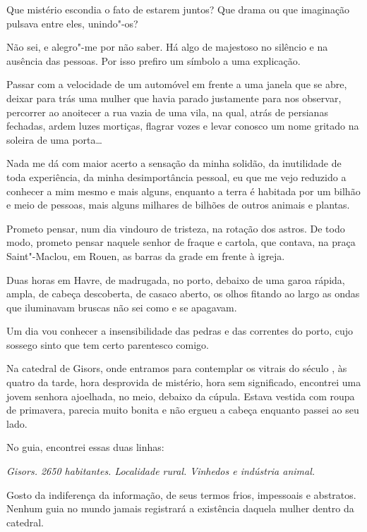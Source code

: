 Que mistério escondia o fato de estarem juntos? Que drama ou que
imaginação pulsava entre eles, unindo"-os?

Não sei, e alegro"-me por não saber. Há algo de majestoso no silêncio e
na ausência das pessoas. Por isso prefiro um símbolo a uma explicação.

\asterisc

Passar com a velocidade de um automóvel em frente a uma janela que se
abre, deixar para trás uma mulher que havia parado justamente para nos
observar, percorrer ao anoitecer a rua vazia de uma vila, na qual, atrás
de persianas fechadas, ardem luzes mortiças, flagrar vozes e levar
conosco um nome gritado na soleira de uma porta\ldots{}

Nada me dá com maior acerto a sensação da minha solidão, da inutilidade
de toda experiência, da minha desimportância pessoal, eu que me vejo
reduzido a conhecer a mim mesmo e mais alguns, enquanto a terra é
habitada por um bilhão e meio de pessoas, mais alguns milhares de
bilhões de outros animais e plantas.

Prometo pensar, num dia vindouro de tristeza, na rotação dos astros. De
todo modo, prometo pensar naquele senhor de fraque e cartola, que
contava, na praça Saint"-Maclou, em Rouen, as barras da grade em frente à
igreja.

\asterisc

Duas horas em Havre, de madrugada, no porto, debaixo de uma garoa
rápida, ampla, de cabeça descoberta, de casaco aberto, os olhos fitando
ao largo as ondas que iluminavam bruscas não sei como e se apagavam.

Um dia vou conhecer a insensibilidade das pedras e das correntes do
porto, cujo sossego sinto que tem certo parentesco comigo.

\asterisc

Na catedral de Gisors, onde entramos para contemplar os vitrais do
século , às quatro da tarde, hora desprovida de mistério, hora sem
significado, encontrei uma jovem senhora ajoelhada, no meio, debaixo da
cúpula. Estava vestida com roupa de primavera, parecia muito bonita e
não ergueu a cabeça enquanto passei ao seu lado.

No guia, encontrei essas duas linhas:

\emph{Gisors. 2650 habitantes. Localidade rural. Vinhedos e indústria
animal.}

Gosto da indiferença da informação, de seus termos frios, impessoais e
abstratos. Nenhum guia no mundo jamais registrará a existência daquela
mulher dentro da catedral.

